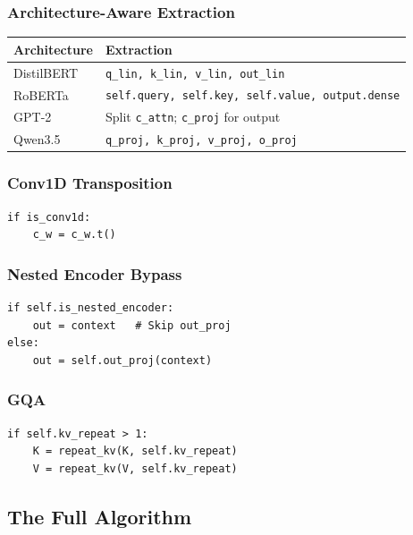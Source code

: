 \subsubsection{Architecture-Aware Extraction}

\begin{table}[H]
\centering
\small
\begin{tabular}{ll}
\toprule
\textbf{Architecture} & \textbf{Extraction} \\
\midrule
DistilBERT & \texttt{q\_lin, k\_lin, v\_lin, out\_lin} \\
RoBERTa & \texttt{self.query, self.key, self.value, output.dense} \\
GPT-2 & Split \texttt{c\_attn}; \texttt{c\_proj} for output \\
Qwen3.5 & \texttt{q\_proj, k\_proj, v\_proj, o\_proj} \\
\bottomrule
\end{tabular}
\end{table}

\subsubsection{Conv1D Transposition}

\begin{lstlisting}
if is_conv1d:
    c_w = c_w.t()
\end{lstlisting}

\subsubsection{Nested Encoder Bypass}

\begin{lstlisting}
if self.is_nested_encoder:
    out = context   # Skip out_proj
else:
    out = self.out_proj(context)
\end{lstlisting}

\subsubsection{GQA}

\begin{lstlisting}
if self.kv_repeat > 1:
    K = repeat_kv(K, self.kv_repeat)
    V = repeat_kv(V, self.kv_repeat)
\end{lstlisting}

\subsection{The Full Algorithm}

